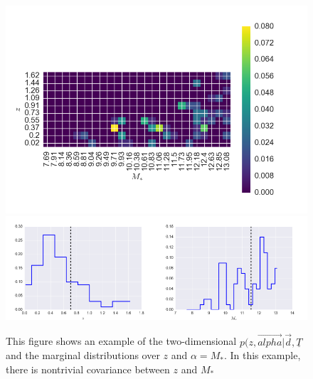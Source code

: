 \documentclass[12pt, preprint]{aastex}
\newcommand{\textul}{\underline}
\begin{document}
\begin{figure}
\includegraphics[width=1.\textwidth]{../fig/knn3.png}\\
\includegraphics[width=0.5\textwidth]{../fig/knn3z.png}\includegraphics[width=0.5\textwidth]{../fig/knn3m.png}
\caption{This figure shows an example of the two-dimensional $p(z,\vec{alpha}|\vec{d},\textul{T}$ and the marginal distributions over $z$ and $\alpha=M_{*}$.  In this example, there is nontrivial covariance between $z$ and $M_{*}$}
\label{fig:knn-bad}
\end{figure}
\end{document}
